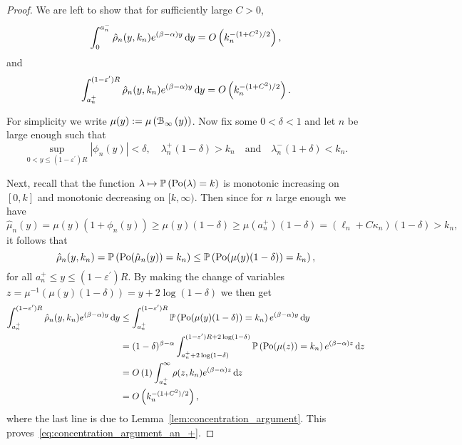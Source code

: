 \begin{proof}
We are left to show that for sufficiently large $C > 0$,
\begin{equation}\label{eq:concentration_argument_an_-}
	 \int_0^{a_n^-} \hat{\rho}_n(y,k_n) e^{(\beta-\alpha) y} \operatorname{\mathrm{d}\hspace{-2pt}} y = O\left(k_n^{-(1+C^2)/2}\right),
\end{equation}
and
\begin{equation}\label{eq:concentration_argument_an_+}
	\int_{a_n^+}^{(1-\varepsilon^\prime)R} \hat{\rho}_n(y,k_n) e^{(\beta-\alpha) y} \operatorname{\mathrm{d}\hspace{-2pt}} y = O\left(k_n^{-(1+C^2)/2}\right).
\end{equation}

For simplicity we write $\mu(y) := \mu\left({\mathcal B}_{\infty}\left(y\right)\right)$. Now fix some $0 < \delta < 1$ and let $n$ be large enough such that 
\[
\sup_{0 < y \le (1-\varepsilon^\prime)R} |\phi_n(y)| < \delta, \quad
\lambda_n^+(1 - \delta) > k_n \quad \text{and} \quad
\lambda_n^-(1 + \delta) < k_n.
\]

Next, recall that the function $\lambda \mapsto \mathbb{P}\left({\mathrm{Po}}(\lambda) = k\right)$ is monotonic increasing on $[0,k]$ and monotonic decreasing on $[k, \infty)$. Then since for $n$ large enough we have 
\[
	\hat{\mu}_n(y) = \mu(y)(1 + \phi_n(y)) \ge \mu(y)(1 - \delta) \ge \mu(a_n^+)(1 - \delta)
	= (\ell_n + C \kappa_n)(1 - \delta) > k_n,
\]
it follows that 
\[
	\hat{\rho}_n(y,k_n) = \mathbb{P}\left({\mathrm{Po}}(\hat{\mu}_n(y)) = k_n\right) \le \mathbb{P}\left({\mathrm{Po}}(\mu(y)(1-\delta)) = k_n\right),
\]
for all $a_n^+ \le y \le (1-\varepsilon^\prime)R$. By making the change of variables $z = \mu^{-1}(\mu(y)(1-\delta)) = y + 2 \log(1-\delta)$ we then get
\begin{align*}
	\int_{a_n^+}^{(1-\varepsilon^\prime)R} \hat{\rho}_n(y,k_n) e^{(\beta - \alpha)y} \operatorname{\mathrm{d}\hspace{-2pt}} y
	&\le \int_{a_n^+}^{(1-\varepsilon^\prime)R} \mathbb{P}\left({\mathrm{Po}}(\mu(y)(1-\delta)) = k_n\right) 
		e^{(\beta-\alpha) y} \operatorname{\mathrm{d}\hspace{-2pt}} y\\
	&= (1-\delta)^{\beta - \alpha} \int_{a_n^+ + 2\log(1-\delta)}^{(1-\varepsilon^\prime)R + 2\log(1-\delta)} 
		\mathbb{P}\left({\mathrm{Po}}(\mu(z)) = k_n\right) e^{(\beta - \alpha)z} \operatorname{\mathrm{d}\hspace{-2pt}} z\\
	&= O\left(1\right) \int_{a_n^+}^{\infty} \rho(z,k_n) e^{(\beta - \alpha)z} \operatorname{\mathrm{d}\hspace{-2pt}} z\\
	&= O\left(k_n^{-(1+C^2)/2}\right),
\end{align*}
where the last line is due to Lemma~\ref{lem:concentration_argument}. This proves~\eqref{eq:concentration_argument_an_+}.



\end{proof}
